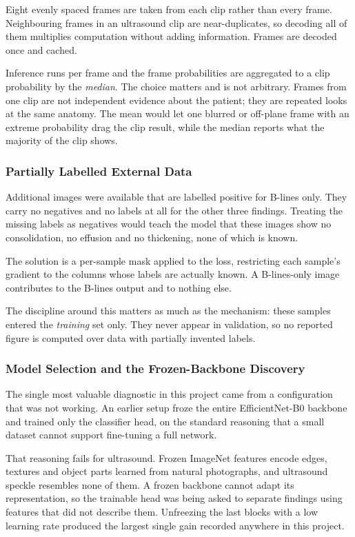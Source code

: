 Eight evenly spaced frames are taken from each clip rather than every frame. Neighbouring frames
in an ultrasound clip are near-duplicates, so decoding all of them multiplies computation
without adding information. Frames are decoded once and cached.

Inference runs per frame and the frame probabilities are aggregated to a clip probability by
the \emph{median}. The choice matters and is not arbitrary. Frames from one clip are not
independent evidence about the patient; they are repeated looks at the same anatomy. The mean
would let one blurred or off-plane frame with an extreme probability drag the clip result, while
the median reports what the majority of the clip shows.

\subsubsection{Partially Labelled External Data}

Additional images were available that are labelled positive for B-lines only. They carry no
negatives and no labels at all for the other three findings. Treating the missing labels as
negatives would teach the model that these images show no consolidation, no effusion and no
thickening, none of which is known.

The solution is a per-sample mask applied to the loss, restricting each sample's gradient to
the columns whose labels are actually known. A B-lines-only image contributes to the B-lines
output and to nothing else.

The discipline around this matters as much as the mechanism: these samples entered the
\emph{training} set only. They never appear in validation, so no reported figure is computed
over data with partially invented labels.

\subsubsection{Model Selection and the Frozen-Backbone Discovery}

The single most valuable diagnostic in this project came from a configuration that was not
working. An earlier setup froze the entire EfficientNet-B0 backbone and trained only the
classifier head, on the standard reasoning that a small dataset cannot support fine-tuning a
full network.

That reasoning fails for ultrasound. Frozen ImageNet features encode edges, textures and object
parts learned from natural photographs, and ultrasound speckle resembles none of them. A frozen
backbone cannot adapt its representation, so the trainable head was being asked to separate
findings using features that did not describe them. Unfreezing the last blocks with a low
learning rate produced the largest single gain recorded anywhere in this project.

